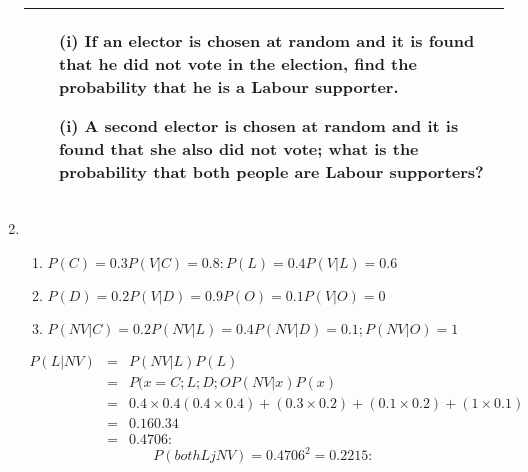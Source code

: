\documentclass[a4paper,12pt]{article}
\begin{document}
\begin{enumerate}
\begin{table}[ht!]
\begin{tabular}{|p{15cm}|}
\begin{itemize}
\item[(i)]If an elector is chosen at random and it is found that he did not vote in the election, find the probability that he is a Labour supporter.  
 
\item[(i)]A second elector is chosen at random and it is found that she also did not vote;  what is the probability that both people are Labour supporters? 
\end{itemize}
\\ \hline 
 \end{tabular}
    \end{table}
\item

\begin{enumerate}
    \item $P(C) = 0.3 P(V |C) = 0.8: P(L) = 0.4 P(V | L) = 0.6$
    \item $P(D) = 0.2 P(V |D) = 0.9 P(O) = 0.1 P(V |O) = 0$
    \item $P(NV |C) = 0.2 P(NV |L) = 0.4 P(NV |D) = 0.1; P(NV |O) = 1$
\end{enumerate}
\begin{eqnarray*}
P(L|NV ) &=& P(NV |L)P(L)\\ 
&=&
P(x=C;L;D;OP(NV |x)P(x)\\
&=& 0.4\times 0.4
(0.4\times 0.4)+(0.3\times 0.2)+(0.1\times 0.2)+(1\times 0.1)\\ &=& 0.16
0.34 \\ &=& 0.4706:
\end{eqnarray*}
\[P(both LjNV ) = 0.4706^2 = 0.2215:\]

\end{enumerate}
\end{document}
